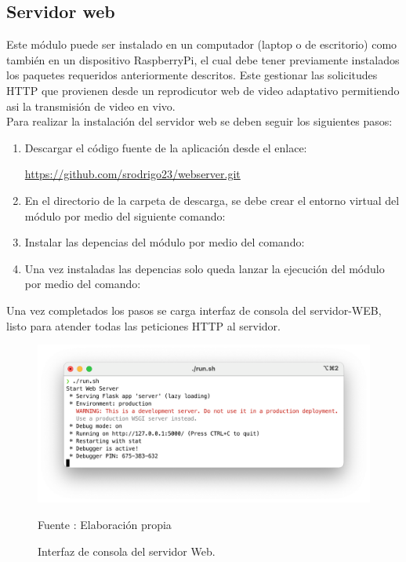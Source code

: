 \subsection*{Servidor web}

Este módulo puede ser instalado en un computador (laptop o de escritorio) como también en un dispositivo RaspberryPi, el cual debe tener previamente instalados los paquetes requeridos anteriormente descritos. Este gestionar las solicitudes HTTP que provienen desde un reprodicutor web de video adaptativo permitiendo asi la transmisión de video en vivo.\\

Para realizar la instalación del servidor web se deben seguir los siguientes pasos:

\begin{enumerate}
    \item Descargar el código fuente de la aplicación desde el enlace: \begin{center}
        \url{https://github.com/srodrigo23/webserver.git}
    \end{center}
    \item En el directorio de la carpeta de descarga, se debe crear el entorno virtual del módulo por medio del siguiente comando: 
    \begin{center}
    \end{center}
    \item Instalar las depencias del módulo por medio del comando:
    \begin{center}
    \end{center} 
    \item Una vez instaladas las depencias solo queda lanzar la ejecución del módulo por medio del comando:\begin{center}
    \end{center}
\end{enumerate}

Una vez completados los pasos se carga interfaz de consola del servidor-WEB, listo para atender todas las peticiones HTTP al servidor.

\begin{figure}[H]
    \begin{center}
        \includegraphics[width=13cm]{img/anexos/mod_web.png}
        \caption{Interfaz de consola del servidor Web.}
        Fuente : Elaboración propia
    \end{center}
\end{figure}
